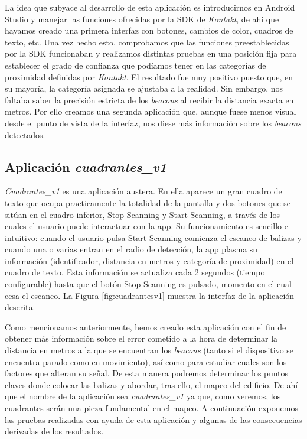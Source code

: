 La idea que subyace al desarrollo de esta aplicación es introducirnos en Android Studio y manejar las funciones ofrecidas por la SDK de \textit{Kontakt}, de ahí que hayamos creado una primera interfaz con botones, cambios de color, cuadros de texto, etc. Una vez hecho esto, comprobamos que las funciones preestablecidas por la SDK funcionaban y realizamos distintas pruebas en una posición fija para establecer el grado de confianza que podíamos tener en las categorías de proximidad definidas por \textit{Kontakt}. El resultado fue muy positivo puesto que, en su mayoría, la categoría asignada se ajustaba a la realidad. Sin embargo, nos faltaba saber la precisión estricta de los \textit{beacons} al recibir la distancia exacta en metros. Por ello creamos una segunda aplicación que, aunque fuese menos visual desde el punto de vista de la interfaz, nos diese más información sobre los \textit{beacons} detectados.

\subsection{Aplicación \textit{cuadrantes\_v1}}
\label{sub:cuadrantesv1}
 \textit{Cuadrantes\_v1} es una aplicación austera. En ella aparece un gran cuadro de texto que ocupa practicamente la totalidad de la pantalla y dos botones que se sitúan en el cuadro inferior,  Stop Scanning y Start Scanning, a través de los cuales el usuario puede interactuar con la app. Su funcionamiento es sencillo e intuitivo: cuando el usuario pulsa Start Scanning comienza el escaneo de balizas y cuando una o varias entran en el radio de detección, la app plasma su información (identificador, distancia en metros y categoría de proximidad) en el cuadro de texto. Esta información se actualiza cada 2 segundos (tiempo configurable) hasta que el botón Stop Scanning es pulsado, momento en el cual cesa el escaneo. La Figura \ref{fig:cuadrantesv1} muestra la interfaz de la aplicación descrita.

Como mencionamos anteriormente, hemos creado esta aplicación con el fin de obtener más información sobre el error cometido a la hora de determinar la distancia en metros a la que se encuentran los \textit{beacons} (tanto si el dispositivo se encuentra parado como en movimiento), así como para estudiar cuales son los factores que alteran su señal. De esta manera podremos determinar los puntos claves donde colocar las balizas y abordar, tras ello, el mapeo del edificio. De ahí que el nombre de la aplicación sea \textit{cuadrantes\_v1} ya que, como veremos, los cuadrantes serán una pieza fundamental en el mapeo. A continuación exponemos las pruebas realizadas con ayuda de esta aplicación y algunas de las consecuencias derivadas de los resultados.


